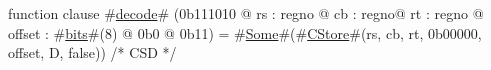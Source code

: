 function clause #\hyperref[zdecode]{decode}# (0b111010 @ rs : regno @ cb : regno@ rt : regno @ offset : #\hyperref[zbits]{bits}#(8) @ 0b0 @ 0b11) = #\hyperref[zSome]{Some}#(#\hyperref[zCStore]{CStore}#(rs, cb, rt, 0b00000, offset, D, false)) /* CSD */
